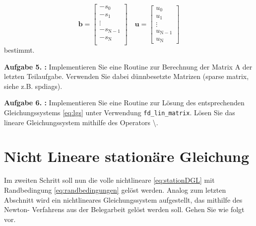 \begin{equation}
	\mathbf{b}=\begin{bmatrix}
	-	s_0 \\
	-	s_1 \\
		\vdots \\
	-	s_{\mathrm{N}-1} \\
	-	s_{\mathrm{N}} \\
	\end{bmatrix} \quad \mathbf{u}=\begin{bmatrix}
		u_0 \\
		u_1 \\
		\vdots \\
		u_{\mathrm{N}-1} \\
		u_\mathrm{N}
	\end{bmatrix}
\end{equation}
bestimmt.
\pagebreak
\begin{mybox}
	\textbf{Aufgabe 5. :} Implementieren Sie eine Routine zur Berechnung der Matrix A der letzten Teilaufgabe. Verwenden
	Sie dabei dünnbesetzte Matrizen (sparse matrix, siehe z.B. spdiags).
\end{mybox}
\begin{figure}[htb]
	
\end{figure}
\clearpage
\begin{mybox}
	\textbf{Aufgabe 6. :} 
	Implementieren Sie eine Routine zur Lösung des entsprechenden Gleichungssystems \cref{eq:lgs} unter Verwendung
\verb*|fd_lin_matrix|. Lösen Sie das lineare Gleichungssystem mithilfe des Operators \textbackslash .
\end{mybox}

\begin{figure}[htb]
	
	\end{figure}
\section{Nicht Lineare stationäre Gleichung}
\begin{mybox}
	Im zweiten Schritt soll nun die volle nichtlineare \cref{eq:stationDGL} mit Randbedingung \cref{eq:randbedingungen} gelöst werden. Analog
	zum letzten Abschnitt wird ein nichtlineares Gleichungssystem aufgestellt, das mithilfe des Newton-
	Verfahrens aus der Belegarbeit gelöst werden soll. Gehen Sie wie folgt vor.\cite{Prof.Dr.AndreasZeiser.April2021}
\end{mybox}

